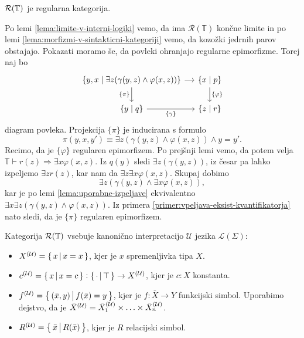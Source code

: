 \documentclass[../kategoricna_logika.tex]{subfiles}
\begin{document}
\begin{trditev}
  $\mathcal{R}(\T)$ je regularna kategorija.
\end{trditev}
\begin{dokaz}
  Po lemi \ref{lema:limite-v-interni-logiki} vemo, da ima
  $\mathcal{R}(\mathbb{T})$ končne limite in po lemi
  \ref{lema:morfizmi-v-sintakticni-kategoriji} vemo, da kozožki
  jedrnih parov obstajajo. Pokazati moramo še, da povleki ohranjajo
  regularne epimorfizme.  Torej naj bo
  \begin{equation*}
    \begin{tikzcd}[column sep=small]
      \{y,x \mid \exists z(\gamma(y,z) \land \varphi(x,z))\} \ar[d,
      "\{\pi\}"'] \ar[r] &
      \{ x \mid p\} \ar[d, "\{\varphi\}"] \\
      \{y \mid q\} \ar[r, "\{\gamma\}"'] & \{z \mid r\}
    \end{tikzcd}
  \end{equation*}
  diagram povleka. Projekcija $\{\pi\}$ je inducirana s formulo
  \[ \pi(y,x,y') \equiv \exists z(\gamma(y,z) \land \varphi(x,z))
    \land y=y'.\] Recimo, da je $\{\varphi\}$ regularen
  epimorfizem. Po prejšnji lemi vemo, da potem velja
  $\mathbb{T} \vdash r(z) \Rightarrow \exists x \varphi(x,z)$.  Iz
  $q(y)$ sledi $\exists z(\gamma(y,z))$, iz česar pa lahko izpeljemo
  $\exists z r(z)$, kar nam da $\exists z \exists x
  \varphi(x,z)$. Skupaj dobimo
  \[ \exists z(\gamma(y,z) \land \exists x \varphi(x,z)),\] kar je po
  lemi \ref{lema:uporabne-izpeljave} ekvivalentno
  $\exists x \exists z(\gamma(y,z) \land \varphi(x,z))$.  Iz primera
  \ref{primer:vpeljava-eksist-kvantifikatorja} nato sledi, da je
  $\{\pi\}$ regularen epimorfizem.
\end{dokaz}
\begin{definicija}
  Kategorija $\mathcal{R}(\T)$ vsebuje kanonično interpretacijo
  $\mathcal{U}$ jezika $\mathcal{L}(\Sigma)$:
  \begin{itemize}
  \item $\interp[\mathcal{U}]{X} = \set{x\,\middle|\, x = x}$, kjer je
    $x$ spremenljivka tipa $X$.
  \item
    $\interp[\mathcal{U}]{c} = \set{x\,\middle|\, x = c} :
    \set{\cdot\,\middle|\, \top} \to \interp[\mathcal{U}]{X}$, kjer je
    $c:X$ konstanta.
  \item
    $\interp[\mathcal{U}]{f} = \set{(\bar{x},y)\,\middle|\, f(\bar{x})
      = y}$, kjer je $f : \bar{X}\to Y$ funkcijski simbol. Uporabimo
    dejstvo, da je
    $\bar{X}^{(\mathcal{U})} = \interp[\mathcal{U}]{\bar{X}_1} \times
    \ldots \times \interp[\mathcal{U}]{\bar{X}_n}$.
  \item
    $\interp[\mathcal{U}]{R} = \set{\bar{x}\,\middle|\, R(\bar{x})}$,
    kjer je $R$ relacijski simbol.
  \end{itemize}
\end{definicija}
\end{document}
